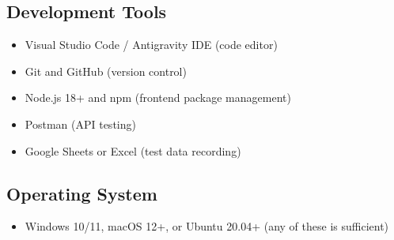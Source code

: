 \subsection{Development Tools}
\begin{itemize}
    \item Visual Studio Code / Antigravity IDE (code editor)
    \item Git and GitHub (version control)
    \item Node.js 18+ and npm (frontend package management)
    \item Postman (API testing)
    \item Google Sheets or Excel (test data recording)
\end{itemize}

\subsection{Operating System}
\begin{itemize}
    \item Windows 10/11, macOS 12+, or Ubuntu 20.04+ (any of these is sufficient)
\end{itemize}
